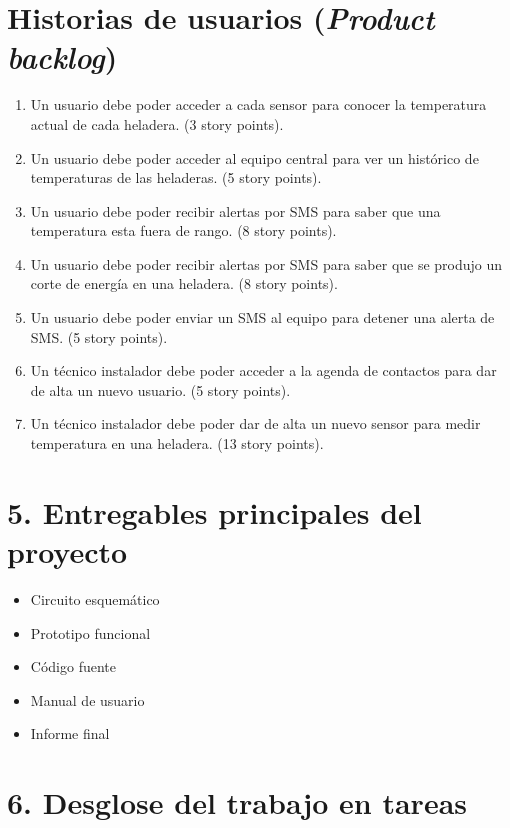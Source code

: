 \documentclass[11pt]{charter}
\begin{document}
\section{Historias de usuarios (\textit{Product backlog})}
\label{sec:backlog}

\begin{enumerate}
    \item Un usuario debe poder acceder a cada sensor para conocer la temperatura actual de cada heladera. (3 story points).
    \item Un usuario debe poder acceder al equipo central para ver un histórico de temperaturas de las heladeras. (5 story points).
    \item Un usuario debe poder recibir alertas por SMS para saber que una temperatura esta fuera de rango. (8 story points).
    \item Un usuario debe poder recibir alertas por SMS para saber que se produjo un corte de energía en una heladera. (8 story points).
    \item Un usuario debe poder enviar un SMS al equipo para detener una alerta de SMS. (5 story points).
    \item Un técnico instalador debe poder acceder a la agenda de contactos para dar de alta un nuevo usuario. (5 story points).
    \item Un técnico instalador debe poder dar de alta un nuevo sensor para medir temperatura en una heladera. (13 story points).
\end{enumerate}

\section{5. Entregables principales del proyecto}
\label{sec:entregables}

\begin{itemize}
\item Circuito esquemático
\item Prototipo funcional
\item Código fuente
\item Manual de usuario
\item Informe final

\end{itemize}



\section{6. Desglose del trabajo en tareas}
\label{sec:wbs}
\end{document}
